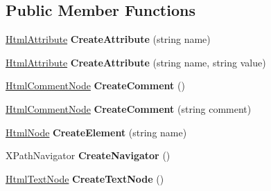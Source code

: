 \subsection*{Public Member Functions}
\begin{DoxyCompactItemize}
\item 
\mbox{\label{class_html_agility_pack_1_1_html_document_ab450c29d85b24ff097fab30efac72bc4}} 
\hyperlink{class_html_agility_pack_1_1_html_attribute}{Html\+Attribute} {\bfseries Create\+Attribute} (string name)
\item 
\mbox{\label{class_html_agility_pack_1_1_html_document_ac6eb06bcc4dff1f20584a625eea28f31}} 
\hyperlink{class_html_agility_pack_1_1_html_attribute}{Html\+Attribute} {\bfseries Create\+Attribute} (string name, string value)
\item 
\mbox{\label{class_html_agility_pack_1_1_html_document_a318060538be0d5308bc34c7a4aab4aba}} 
\hyperlink{class_html_agility_pack_1_1_html_comment_node}{Html\+Comment\+Node} {\bfseries Create\+Comment} ()
\item 
\mbox{\label{class_html_agility_pack_1_1_html_document_a36a57131b52c2c568ebc5a4681fda518}} 
\hyperlink{class_html_agility_pack_1_1_html_comment_node}{Html\+Comment\+Node} {\bfseries Create\+Comment} (string comment)
\item 
\mbox{\label{class_html_agility_pack_1_1_html_document_a0bf47c03adde8bcd9f5c163f0e6d44b9}} 
\hyperlink{class_html_agility_pack_1_1_html_node}{Html\+Node} {\bfseries Create\+Element} (string name)
\item 
\mbox{\label{class_html_agility_pack_1_1_html_document_a6c0c82129a0452708f686a9ac329a0a5}} 
X\+Path\+Navigator {\bfseries Create\+Navigator} ()
\item 
\mbox{\label{class_html_agility_pack_1_1_html_document_a99b02a7976586083216b10c859f51535}} 
\hyperlink{class_html_agility_pack_1_1_html_text_node}{Html\+Text\+Node} {\bfseries Create\+Text\+Node} ()

\end{DoxyCompactItemize}
